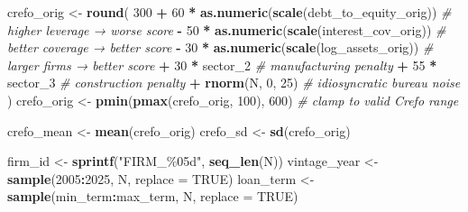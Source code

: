 \documentclass[
]{article}
\newenvironment{Shaded}{\begin{snugshade}}{\end{snugshade}}
\newcommand{\AttributeTok}[1]{\textcolor[rgb]{0.13,0.29,0.53}{#1}}
\newcommand{\CommentTok}[1]{\textcolor[rgb]{0.56,0.35,0.01}{\textit{#1}}}
\newcommand{\ConstantTok}[1]{\textcolor[rgb]{0.56,0.35,0.01}{#1}}
\newcommand{\DecValTok}[1]{\textcolor[rgb]{0.00,0.00,0.81}{#1}}
\newcommand{\FunctionTok}[1]{\textcolor[rgb]{0.13,0.29,0.53}{\textbf{#1}}}
\newcommand{\NormalTok}[1]{#1}
\newcommand{\OtherTok}[1]{\textcolor[rgb]{0.56,0.35,0.01}{#1}}
\newcommand{\SpecialCharTok}[1]{\textcolor[rgb]{0.81,0.36,0.00}{\textbf{#1}}}
\newcommand{\StringTok}[1]{\textcolor[rgb]{0.31,0.60,0.02}{#1}}
\begin{document}
\begin{Shaded}
\begin{Highlighting}[]
\NormalTok{  crefo\_orig }\OtherTok{\textless{}{-}} \FunctionTok{round}\NormalTok{(}
    \DecValTok{300}
    \SpecialCharTok{+} \DecValTok{60}  \SpecialCharTok{*} \FunctionTok{as.numeric}\NormalTok{(}\FunctionTok{scale}\NormalTok{(debt\_to\_equity\_orig))   }\CommentTok{\# higher leverage → worse score}
    \SpecialCharTok{{-}} \DecValTok{50}  \SpecialCharTok{*} \FunctionTok{as.numeric}\NormalTok{(}\FunctionTok{scale}\NormalTok{(interest\_cov\_orig))     }\CommentTok{\# better coverage → better score}
    \SpecialCharTok{{-}} \DecValTok{30}  \SpecialCharTok{*} \FunctionTok{as.numeric}\NormalTok{(}\FunctionTok{scale}\NormalTok{(log\_assets\_orig))       }\CommentTok{\# larger firms → better score}
    \SpecialCharTok{+} \DecValTok{30}  \SpecialCharTok{*}\NormalTok{ sector\_2                                 }\CommentTok{\# manufacturing penalty}
    \SpecialCharTok{+} \DecValTok{55}  \SpecialCharTok{*}\NormalTok{ sector\_3                                 }\CommentTok{\# construction penalty}
    \SpecialCharTok{+} \FunctionTok{rnorm}\NormalTok{(N, }\DecValTok{0}\NormalTok{, }\DecValTok{25}\NormalTok{)                                }\CommentTok{\# idiosyncratic bureau noise}
\NormalTok{  )}
\NormalTok{  crefo\_orig }\OtherTok{\textless{}{-}} \FunctionTok{pmin}\NormalTok{(}\FunctionTok{pmax}\NormalTok{(crefo\_orig, }\DecValTok{100}\NormalTok{), }\DecValTok{600}\NormalTok{)     }\CommentTok{\# clamp to valid Crefo range}
  
\NormalTok{  crefo\_mean }\OtherTok{\textless{}{-}} \FunctionTok{mean}\NormalTok{(crefo\_orig)}
\NormalTok{  crefo\_sd   }\OtherTok{\textless{}{-}} \FunctionTok{sd}\NormalTok{(crefo\_orig)}
  
\NormalTok{  firm\_id      }\OtherTok{\textless{}{-}} \FunctionTok{sprintf}\NormalTok{(}\StringTok{"FIRM\_\%05d"}\NormalTok{, }\FunctionTok{seq\_len}\NormalTok{(N))}
\NormalTok{  vintage\_year }\OtherTok{\textless{}{-}} \FunctionTok{sample}\NormalTok{(}\DecValTok{2005}\SpecialCharTok{:}\DecValTok{2025}\NormalTok{, N, }\AttributeTok{replace =} \ConstantTok{TRUE}\NormalTok{)}
\NormalTok{  loan\_term    }\OtherTok{\textless{}{-}} \FunctionTok{sample}\NormalTok{(min\_term}\SpecialCharTok{:}\NormalTok{max\_term, N, }\AttributeTok{replace =} \ConstantTok{TRUE}\NormalTok{)}
  

\end{Highlighting}
\end{Shaded}
\end{document}
